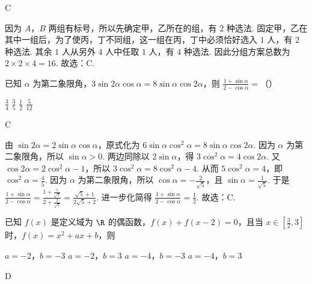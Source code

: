 \begin{answer}
C
\end{answer}

\begin{solution}
因为 \(A\)，\(B\) 两组有标号，所以先确定甲，乙所在的组，有 \(2\) 种选法.
固定甲，乙在其中一组后，为了使丙，丁不同组，这一组在丙，丁中必须恰好选入 \(1\) 人，有 \(2\) 种选法. 其余 \(1\) 人从另外 \(4\) 人中任取 \(1\) 人，有 \(4\) 种选法.
因此分组方案总数为 \(2\times 2\times 4=16\). 故选：C.
\end{solution}

\begin{problem}
已知 \(\alpha\) 为第二象限角，\(3\sin 2\alpha \cos \alpha=8\sin \alpha \cos 2\alpha\)，则 \(\frac{1+\sin \alpha}{2-\cos \alpha}=\)（\quad）

\choices
    {\(\frac{3}{4}\)}
    {\(\frac{3}{5}\)}
    {\(\frac{1}{2}\)}
    {\(\frac{5}{12}\)}
\end{problem}

\begin{answer}
C
\end{answer}

\begin{solution}
由 \(\sin 2\alpha=2\sin \alpha \cos \alpha\)，原式化为 \(6\sin \alpha \cos^2 \alpha=8\sin \alpha \cos 2\alpha\). 因为 \(\alpha\) 为第二象限角，所以 \(\sin \alpha>0\). 两边同除以 \(2\sin \alpha\)，得 \(3\cos^2 \alpha=4\cos 2\alpha\). 又 \(\cos 2\alpha=2\cos^2 \alpha-1\)，所以 \(3\cos^2 \alpha=8\cos^2 \alpha-4\). 从而 \(5\cos^2 \alpha=4\)，即 \(\cos^2 \alpha=\frac{4}{5}\). 因为 \(\alpha\) 为第二象限角，所以 \(\cos \alpha=-\frac{2}{\sqrt{5}}\)，且 \(\sin \alpha=\frac{1}{\sqrt{5}}\). 于是 \(\frac{1+\sin \alpha}{2-\cos \alpha}=\frac{1+\frac{1}{\sqrt{5}}}{2+\frac{2}{\sqrt{5}}}=\frac{\sqrt{5}+1}{2\sqrt{5}+2}\). 进一步化简得 \(\frac{1+\sin \alpha}{2-\cos \alpha}=\frac{1}{2}\).
故选：C.
\end{solution}

\begin{problem}
已知 \(f\left( x \right)\) 是定义域为 \(\R\) 的偶函数，\(f\left( x \right)+f\left( x-2 \right)=0\)，且当 \(x\in \left[ \frac{3}{2},3 \right]\) 时，\(f\left( x \right)=x^2+ax+b\)，则

\choices
    {\(a=-2\)，\(b=-3\)}
    {\(a=-2\)，\(b=3\)}
    {\(a=-4\)，\(b=-3\)}
    {\(a=-4\)，\(b=3\)}
\end{problem}

\begin{answer}
D
\end{answer}

